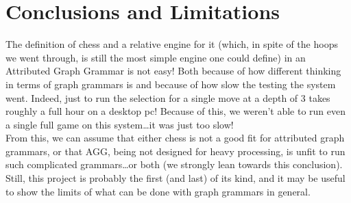\documentclass[a4paper, 10pt]{scrartcl}
\begin{document}
    \section{Conclusions and Limitations}
    The definition of chess and a relative engine for it (which, in spite of the hoops we went through, is still the most simple engine one could define) in an Attributed Graph Grammar is not easy! Both because of how different thinking in terms of graph grammars is and because of how slow the testing the system went. Indeed, just to run the selection for a single move at a depth of 3 takes roughly a full hour on a desktop pc! Because of this, we weren't able to run even a single full game on this system\dots it was just too slow!\\From this, we can assume that either chess is not a good fit for attributed graph grammars, or that AGG, being not designed for heavy processing, is unfit to run such complicated grammars\dots or both (we strongly lean towards this conclusion). Still, this project is probably the first (and last) of its kind, and it may be useful to show the limits of what can be done with graph grammars in general.
\end{document}
